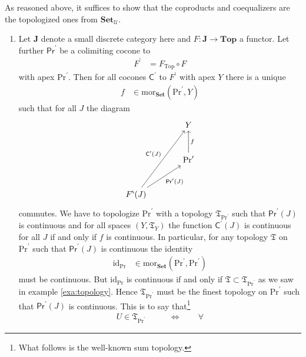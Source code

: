\begin{prf}
As reasoned above, it suffices to show that the coproducts and coequalizers are the topologized ones from $\mathbf{Set}_{\mathcal{U}}$.
\begin{enumerate}
\item[(a)]
Let $\mathbf{J}$ denote a small discrete category here and $F \colon \mathbf{J} \rightarrow \mathbf{Top}$ a functor.
Let further $\mathsf{Pr}^{\prime}$ be a colimiting cocone to
\begin{align*}
  F^{\backprime}
  &=
  F_{\mathrm{Top}}
  \circ
  F
\end{align*}
with apex $\mathrm{Pr}^{\prime}$.
Then for all cocones $\mathsf{C}^{\prime}$ to $F^{\backprime}$ with apex $Y$ there is a unique
\begin{align*}
  f
  &\in
  \mathrm{mor}_{\mathbf{Set}}
  \left(
    \mathrm{Pr}^{\prime},
    Y
  \right)
\end{align*}
such that for all $J$ the diagram
\[
\begin{tikzcd}[sep=large]
  &
  Y
  \\
  &
  \mathrm{Pr}^{\prime}
  \arrow[swap]{u}{f}
  \\
  F^{\backprime}(J)
  \arrow{uur}{\mathsf{C}^{\prime}(J)}
  \arrow[swap]{ur}{\mathsf{Pr}^{\prime}(J)}
\end{tikzcd}
\]
commutes.
We have to topologize $\mathrm{Pr}^{\prime}$ with a topology $\mathfrak{T}_{\mathrm{Pr}^{\prime}}$ such that $\mathsf{Pr}^{\prime}(J)$ is continuous and for all spaces $(Y,\mathfrak{T}_{Y})$ the function $\mathsf{C}^{\prime}(J)$ is continuous for all $J$ if and only if $f$ is continuous.
In particular, for any topology $\mathfrak{T}$ on $\mathrm{Pr}^{\prime}$ such that $\mathsf{Pr}^{\prime}(J)$ is continuous the identity
\begin{align*}
  \mathrm{id}_{\mathrm{Pr}}
  &\in
  \mathrm{mor}_{\mathbf{Set}}
  \left(
    \mathrm{Pr}^{\prime},
    \mathrm{Pr}^{\prime}
  \right)
\end{align*}
must be continuous.
But $\mathrm{id}_{\mathrm{Pr}}$ is continuous if and only if $\mathfrak{T} \subset \mathfrak{T}_{\mathrm{Pr}^{\prime}}$ as we saw in example \ref{exa:topology}.
Hence $\mathfrak{T}_{\mathrm{Pr}^{\prime}}$ must be the finest topology on $\mathrm{Pr}^{\prime}$ such that $\mathsf{Pr}^{\prime}(J)$ is continuous.
This is to say that\footnote{What follows is the well-known sum topology.}
\begin{align*}
  U
  \in
  \mathfrak{T}_{\mathrm{Pr}^{\prime}}
  \qquad
  &\Leftrightarrow
  \qquad
  \forall

\end{align*}
\end{enumerate}
\end{prf}

